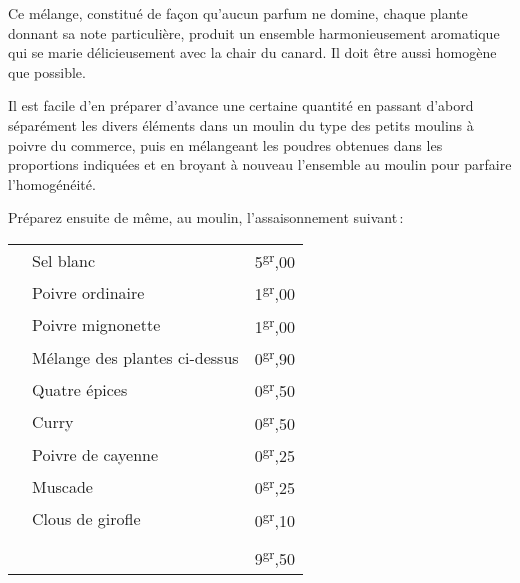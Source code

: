 Ce mélange, constitué de façon qu'aucun parfum ne domine, chaque plante donnant
sa note particulière, produit un ensemble harmonieusement aromatique qui se
marie délicieusement avec la chair du canard. Il doit être aussi homogène que
possible.

Il est facile d'en préparer d'avance une certaine quantité en passant d'abord
séparément les divers éléments dans un moulin du type des petits moulins
à poivre du commerce, puis en mélangeant les poudres obtenues dans les
proportions indiquées et en broyant à nouveau l’ensemble au moulin pour
parfaire l'homogénéité.

\medskip

Préparez ensuite de même, au moulin, l’assaisonnement suivant :

\medskip

\label{pg0585} \hypertarget{p0585}{}
\footnotesize
\begin{longtable}{p{0.5em}p{16em}l}
& Sel blanc                       \dotfill                        &  5\textsuperscript{gr},00             \\
& Poivre ordinaire                \dotfill                        &  1\textsuperscript{gr},00             \\
& Poivre mignonette               \dotfill                        &  1\textsuperscript{gr},00             \\
& Mélange des plantes ci-dessus   \dotfill                        &  0\textsuperscript{gr},90             \\
& Quatre épices                   \dotfill                        &  0\textsuperscript{gr},50             \\
& Curry                           \dotfill                        &  0\textsuperscript{gr},50             \\
& Poivre de cayenne               \dotfill                        &  0\textsuperscript{gr},25             \\
& Muscade                         \dotfill                        &  0\textsuperscript{gr},25             \\
& Clous de girofle                \dotfill                        &  0\textsuperscript{gr},10             \\
&                                                                 &  \hrulefill                           \\
&                                                                 &  9\textsuperscript{gr},50             \\
\end{longtable}
\normalsize

